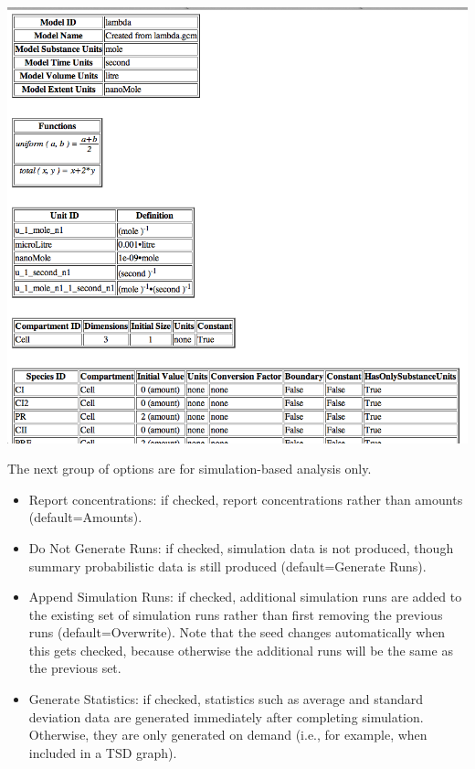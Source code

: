 \documentclass[titlepage,11pt]{article}
\begin{document}
\begin{center}
\includegraphics[width=160mm]{screenshots/viewBrowser}
\end{center}

\noindent
The next group of options are for simulation-based analysis only.
\begin{itemize}
\item Report concentrations: if checked, report concentrations rather than amounts (default=Amounts).
\item Do Not Generate Runs: if checked, simulation data is not produced, though summary probabilistic data is still produced (default=Generate Runs).
\item Append Simulation Runs: if checked, additional simulation runs are added to the existing set of simulation runs rather than first removing the previous runs (default=Overwrite).  Note that the seed changes automatically when this gets checked, because otherwise the additional runs will be the same as the previous set.
\item Generate Statistics: if checked, statistics such as average and standard deviation data are generated immediately after completing simulation.  Otherwise, they are only generated on demand (i.e., for example, when included in a TSD graph).
\end{itemize} 
\end{document}
